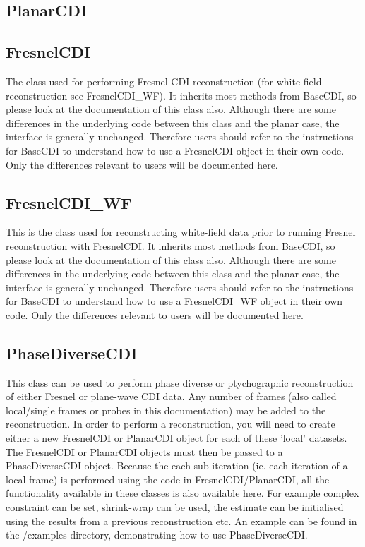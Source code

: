 \documentclass[]{nadia}
\begin{document}
\subsection{PlanarCDI}

\subsection{FresnelCDI}
The class used for performing Fresnel CDI reconstruction (for
white-field reconstruction see FresnelCDI\_WF). It inherits most
methods from BaseCDI, so please look at the documentation of this
class also. Although there are some differences in the underlying code
between this class and the planar case, the interface is generally
unchanged. Therefore users should refer to the instructions for
BaseCDI to understand how to use a FresnelCDI object in their own
code. Only the differences relevant to users will be documented here.

\subsection{FresnelCDI\_WF}
This is the class used for reconstructing white-field data prior to
running Fresnel reconstruction with FresnelCDI. It inherits most
methods from BaseCDI, so please look at the documentation of this
class also. Although there are some differences in the underlying code
between this class and the planar case, the interface is generally
unchanged. Therefore users should refer to the instructions for
BaseCDI to understand how to use a FresnelCDI\_WF object in their own
code. Only the differences relevant to users will be documented here.

\subsection{PhaseDiverseCDI}

This class can be used to perform phase diverse or ptychographic
reconstruction of either Fresnel or plane-wave CDI data. Any number of
frames (also called local/single frames or probes in this
documentation) may be added to the reconstruction. In order to perform
a reconstruction, you will need to create either a new FresnelCDI or
PlanarCDI object for each of these 'local' datasets. The FresnelCDI or
PlanarCDI objects must then be passed to a PhaseDiverseCDI
object. Because the each sub-iteration (ie. each iteration of a local
frame) is performed using the code in FresnelCDI/PlanarCDI, all the
functionality available in these classes is also available here. For
example complex constraint can be set, shrink-wrap can be used, the
estimate can be initialised using the results from a previous
reconstruction etc. An example can be found in the /examples
directory, demonstrating how to use PhaseDiverseCDI.
\end{document}
